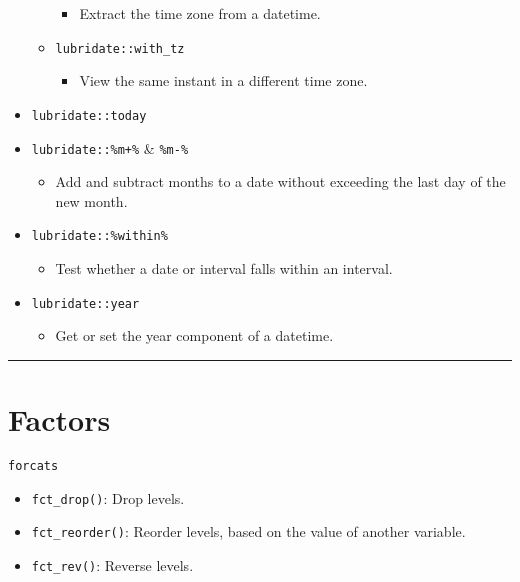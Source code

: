 \documentclass[
]{book}
\providecommand{\tightlist}{%
  \setlength{\itemsep}{0pt}\setlength{\parskip}{0pt}}
\begin{document}
\begin{itemize}
\begin{itemize}
    \begin{itemize}
    \tightlist
    \item
      Extract the time zone from a datetime.
    \end{itemize}
  \item
    \texttt{lubridate::with\_tz}

    \begin{itemize}
    \tightlist
    \item
      View the same instant in a different time zone.
    \end{itemize}
  \end{itemize}
\item
  \texttt{lubridate::today}
\item
  \texttt{lubridate::\%m+\%} \& \texttt{\%m-\%}

  \begin{itemize}
  \tightlist
  \item
    Add and subtract months to a date without exceeding the last day of the new month.
  \end{itemize}
\item
  \texttt{lubridate::\%within\%}

  \begin{itemize}
  \tightlist
  \item
    Test whether a date or interval falls within an interval.
  \end{itemize}
\item
  \texttt{lubridate::year}

  \begin{itemize}
  \tightlist
  \item
    Get or set the year component of a datetime.
  \end{itemize}
\end{itemize}

\begin{center}\rule{0.5\linewidth}{0.5pt}\end{center}

\hypertarget{factors}{%
\section{Factors}\label{factors}}

\texttt{forcats}

\begin{itemize}
\tightlist
\item
  \texttt{fct\_drop()}: Drop levels.
\item
  \texttt{fct\_reorder()}: Reorder levels, based on the value of another variable.
\item
  \texttt{fct\_rev()}: Reverse levels.
\end{itemize}
\end{document}
